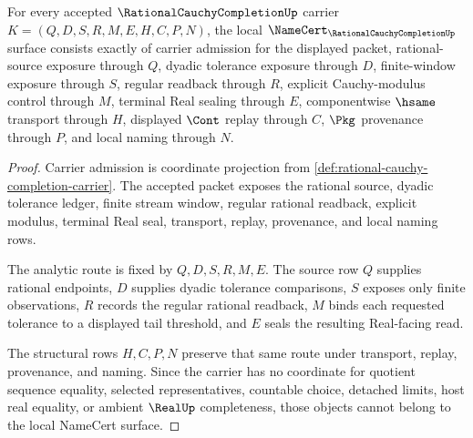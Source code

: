 \begin{theorem}
\label{thm:rational-cauchy-completion-namecert-obligations}
For every accepted $\RationalCauchyCompletionUp$ carrier $K=(Q,D,S,R,M,E,H,C,P,N)$, the local $\NameCert_{\RationalCauchyCompletionUp}$ surface consists exactly of carrier admission for the displayed packet, rational-source exposure through $Q$, dyadic tolerance exposure through $D$, finite-window exposure through $S$, regular readback through $R$, explicit Cauchy-modulus control through $M$, terminal Real sealing through $E$, componentwise $\hsame$ transport through $H$, displayed $\Cont$ replay through $C$, $\Pkg$ provenance through $P$, and local naming through $N$.
\end{theorem}
\begin{proof}
Carrier admission is coordinate projection from \autoref{def:rational-cauchy-completion-carrier}. The accepted packet exposes the rational source, dyadic tolerance ledger, finite stream window, regular rational readback, explicit modulus, terminal Real seal, transport, replay, provenance, and local naming rows.

The analytic route is fixed by $Q,D,S,R,M,E$. The source row $Q$ supplies rational endpoints, $D$ supplies dyadic tolerance comparisons, $S$ exposes only finite observations, $R$ records the regular rational readback, $M$ binds each requested tolerance to a displayed tail threshold, and $E$ seals the resulting Real-facing read.

The structural rows $H,C,P,N$ preserve that same route under transport, replay, provenance, and naming. Since the carrier has no coordinate for quotient sequence equality, selected representatives, countable choice, detached limits, host real equality, or ambient $\RealUp$ completeness, those objects cannot belong to the local NameCert surface.
\end{proof}

